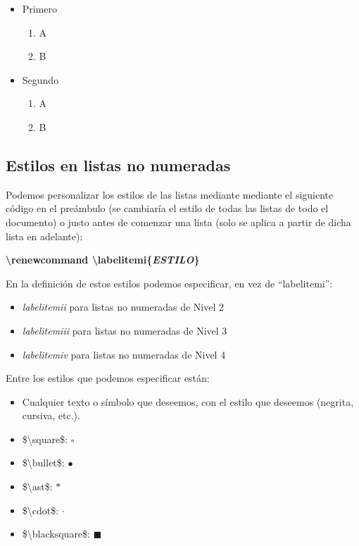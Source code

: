 \documentclass[12pt]{book} %
\begin{document}
\begin{itemize}
\item Primero
	\begin{enumerate}
	\item A
	\item B
	\end{enumerate}
\item Segundo
	\begin{enumerate}
	\item A
	\item B
	\end{enumerate}
\end{itemize}

\subsection{Estilos en listas no numeradas}

Podemos personalizar los estilos de las listas mediante mediante el siguiente código en el preámbulo (se cambiaría el estilo de todas las listas de todo el documento) o justo antes de comenzar una lista (solo se aplica a partir de dicha lista en adelante):

\textbf{\textbackslash renewcommand \textbackslash labelitemi\{\emph{ESTILO}\}}

En la definición de estos estilos podemos especificar, en vez de ``labelitemi'':

\begin{itemize}
	\item \emph{labelitemii} para listas no numeradas de Nivel 2
	\item \emph{labelitemiii} para listas no numeradas de Nivel 3
	\item\emph{labelitemiv} para listas no numeradas de Nivel 4
\end{itemize}

Entre los estilos que podemos especificar están:

\renewcommand\labelitemi{$\cdot$}
\begin{itemize}
	\item Cualquier texto o símbolo que deseemos, con el estilo que deseemos (negrita, cursiva, etc.).
	\item \$\textbackslash square\$: $\square$
	\item \$\textbackslash bullet\$: $\bullet$
	\item \$\textbackslash ast\$: $\ast$
	\item \$\textbackslash cdot\$: $\cdot$
	\item \$\textbackslash blacksquare\$: $\blacksquare$
\end{itemize}
\end{document}
